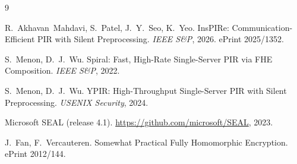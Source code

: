 \documentclass[11pt,a4paper]{article}
\begin{document}
\begin{thebibliography}{9}

R.~Akhavan~Mahdavi, S.~Patel, J.~Y.~Seo, K.~Yeo.
{InsPIRe}: Communication-Efficient {PIR} with Silent Preprocessing.
\emph{IEEE S\&P}, 2026. ePrint 2025/1352.

S.~Menon, D.~J.~Wu.
{Spiral}: Fast, High-Rate Single-Server {PIR} via {FHE} Composition.
\emph{IEEE S\&P}, 2022.

S.~Menon, D.~J.~Wu.
{YPIR}: High-Throughput Single-Server {PIR} with Silent Preprocessing.
\emph{USENIX Security}, 2024.

Microsoft SEAL (release 4.1).
\url{https://github.com/microsoft/SEAL}, 2023.

J.~Fan, F.~Vercauteren.
Somewhat Practical Fully Homomorphic Encryption.
ePrint 2012/144.

\end{thebibliography}
\end{document}
